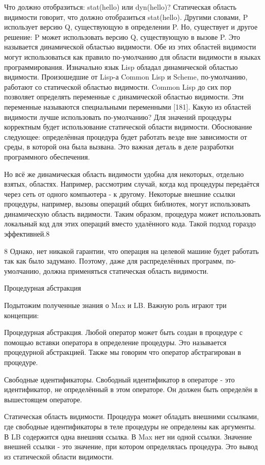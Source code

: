 Что должно отобразиться: stat(hello) или dyn(hello)? Статическая область видимости говорит, что должно отобразиться stat(hello). Другими словами, P использует версию Q, существующую в определении P. Но, существует и другое решение: P может использовать версию Q, существующую в вызове P. Это называется динамической областью видимости. Обе из этих областей видимости могут использоваться как правило по-умолчанию для области видимости в языках программирования. Изначально язык Lisp обладал динамической областью видимости. Произошедшие от Lisp-а Common Lisp и Scheme, по-умолчанию, работают со статической областью видимости. Common Lisp до сих пор позволяет определять переменные с динамической областью видимости. Эти переменные называются специальными переменными [181]. Какую из областей видимости лучше использовать по-умолчанию? Для значений процедуры корректным будет использование статической области видимости. Обоснование следующее: определённая процедура будет работать везде вне зависимости от среды, в которой она была вызвана. Это важная деталь в деле разработки программного обеспечения.

Но всё же динамическая область видимости удобна для некоторых, отдельно взятых, областях. Например, рассмотрим случай, когда код процедуры передаётся через сеть от одного компьютера - к другому. Некоторые внешние ссылки процедуры, например, вызовы операций общих библиотек, могут использовать динамическую область видимости. Таким образом, процедура может использовать локальный код для этих операций вместо удалённого кода. Такой подход гораздо эффективней.8

8 Однако, нет никакой гарантии, что операция на целевой машине будет работать так как было задумано. Поэтому, даже для распределённых программ, по-умолчанию, должна применяться статическая область видимости.

Процедурная абстракция

Подытожим полученные знания о Max и LB. Важную роль играют три концепции:

Процедурная абстракция. Любой оператор может быть создан в процедуре с помощью вставки оператора в определение процедуры. Это называется процедурной абстракцией. Также мы говорим что оператор абстрагирован в процедуре.

Свободные идентификаторы. Свободный идентификатор в операторе - это идентификатор, не определённый в этом операторе. Он должен быть определён в вышестоящем операторе.

Статическая область видимости. Процедура может обладать внешними ссылками, где свободные идентификаторы в теле процедуры не определены как аргументы. В LB содержится одна внешняя ссылка. В Max нет ни одной ссылки. Значение внешней ссылки - это значение, при котором определялась процедура. Это вывод из статической области видимости.

